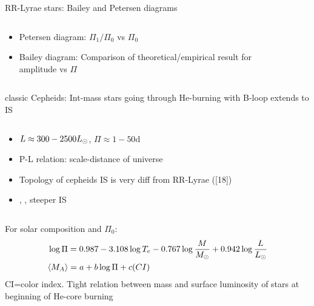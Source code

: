 \begin{frame}{RR-Lyrae stars: Bailey and Petersen diagrams}
\begin{columns}[T]
\begin{column}{0.55\textwidth}
	\begin{itemize}
	\item Petersen diagram: $\Pi_1/\Pi_0$ vs $\Pi_0$
	\item Bailey diagram: Comparison of theoretical/empirical result for amplitude vs $\Pi$
	\end{itemize}
	\end{column}
	\begin{column}{0.45\textwidth}
	\begin{figure}[!ht]
	\end{figure}
\end{column}\end{columns}
\end{frame}

\begin{frame}{classic Cepheids: Int-mass stars going through He-burning with B-loop extends to IS}
\begin{columns}[T]
	\begin{column}{0.55\textwidth}
		\begin{itemize}
			\item $L\approx300-2500L_{\odot}$, $\Pi\approx1-50\si{\day}$
			\item P-L relation: scale-distance of universe
			\item Topology of cepheids IS is very diff from RR-Lyrae ([18])
			\item {}, , steeper IS
		\end{itemize}
	\end{column}
	\begin{column}{0.45\textwidth}
		\begin{figure}[!ht]
		\end{figure}
\end{column}\end{columns}
For solar composition and $\Pi_0$:
\begin{align*}
&\log{\Pi}=0.987-3.108\log{T_e}-0.767\log{\frac{M}{M_{\odot}}}+0.942\log{\frac{L}{L_{\odot}}}\\
&\langle M_A \rangle=a+b\log{\Pi}+c(CI)
\end{align*}
CI=color index. Tight relation between mass and surface luminosity of stars at beginning of He-core burning
\end{frame}

